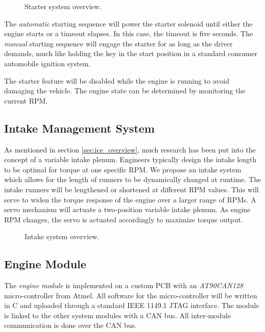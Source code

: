 \begin{figure}[H]
	\centering
		
	\caption{Starter system overview.}
	\label{fig:starter_system_overview}
\end{figure}

The \emph{automatic} starting sequence will power the starter solenoid until either the engine starts or a timeout elapses. In this case, the timeout is five seconds. The \emph{manual} starting sequence will engage the starter for as long as the driver demands, much like holding the key in the start position in a standard consumer automobile ignition system. 

The starter feature will be disabled while the engine is running to avoid damaging the vehicle. The engine state can be determined by monitoring the current RPM.

\subsection{Intake Management System}

As mentioned in section \ref{sec:ice_overview}, much research has been put into the concept of a variable intake plenum. Engineers typically design the intake length to be optimal for torque at one specific RPM. We propose an intake system which allows for the length of runners to be dynamically changed at runtime. The intake runners will be lengthened or shortened at different RPM values. This will serve to widen the torque response of the engine over a larger range of RPMs. A servo mechanism will actuate a two-position variable intake plenum. As engine RPM changes, the servo is actuated accordingly to maximize torque output.

\begin{figure}[H]
	\centering
		
	\caption{Intake system overview.}
	\label{fig:intake_system_overview}
\end{figure}

\subsection{Engine Module}
\label{sec:engine_module}

The \emph{engine module} is implemented on a custom PCB with an \emph{AT90CAN128} micro-controller from Atmel. All software for the micro-controller will be written in C and uploaded through a standard IEEE 1149.1 JTAG interface. The module is linked to the other system modules with a CAN bus. All inter-module communication is done over the CAN bus.

